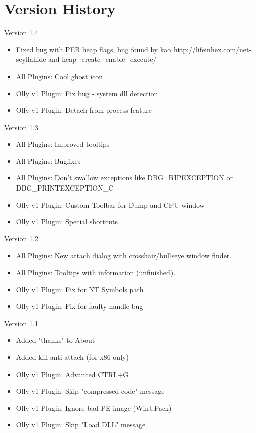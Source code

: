 \documentclass[10pt,a4paper]{article}
\begin{document}
\pagebreak

\section{Version History}

Version 1.4
\begin{itemize}
\item Fixed bug with PEB heap flags, bug found by kao \url{http://lifeinhex.com/net-scyllahide-and-heap_create_enable_execute/}
\item All Plugins: Cool ghost icon
\item Olly v1 Plugin: Fix bug - system dll detection
\item Olly v1 Plugin: Detach from process feature
\end{itemize}

Version 1.3
\begin{itemize}
\item All Plugins: Improved tooltips
\item All Plugins: Bugfixes
\item All Plugins: Don't swallow exceptions like DBG\_RIPEXCEPTION or DBG\_PRINTEXCEPTION\_C
\item Olly v1 Plugin: Custom Toolbar for Dump and CPU window
\item Olly v1 Plugin: Special shortcuts
\end{itemize}

Version 1.2
\begin{itemize}
\item All Plugins: New attach dialog with crosshair/bullseye window finder.
\item All Plugins: Tooltips with information (unfinished).
\item Olly v1 Plugin: Fix for NT Symbols path
\item Olly v1 Plugin: Fix for faulty handle bug
\end{itemize}

Version 1.1
\begin{itemize}
\item Added "thanks" to About
\item Added kill anti-attach (for x86 only)
\item Olly v1 Plugin: Advanced CTRL+G
\item Olly v1 Plugin: Skip "compressed code" message
\item Olly v1 Plugin: Ignore bad PE image (WinUPack)
\item Olly v1 Plugin: Skip "Load DLL" message
\end{itemize}


\end{document}
